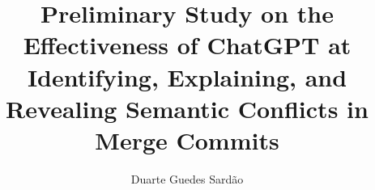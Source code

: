 \documentclass[11pt,a4paper]{report}
\begin{document}
\title{Preliminary Study on the Effectiveness of ChatGPT at Identifying, Explaining,
and Revealing Semantic Conflicts in Merge Commits}
\author{Duarte Guedes Sardão}











\begin{Prolog}
  \cleardoublepage
  \tableofcontents
  \cleardoublepage
  \listoffigures
  \cleardoublepage
  \listoftables
\end{Prolog}

\StartBody




%

\end{document}
